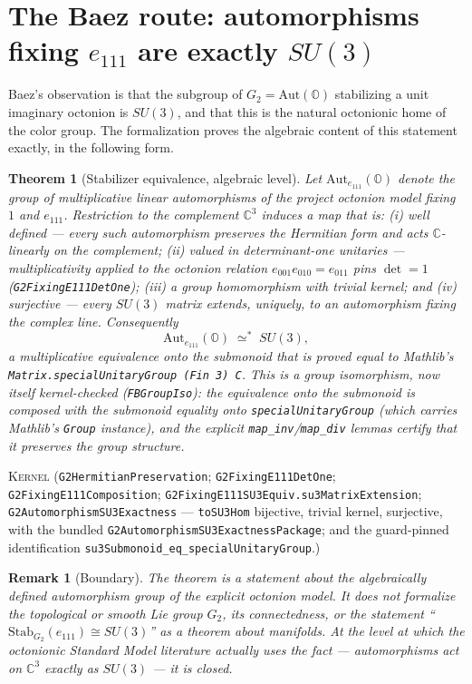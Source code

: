 \documentclass[11pt]{article}
\newcommand{\C}{\mathbb{C}}
\newcommand{\OO}{\mathbb{O}}
\newcommand{\Kernel}{\textcolor{kernelcolor}{\textsc{Kernel}}}
\newcommand{\leanname}[1]{\texttt{#1}}
\newtheorem{theorem}{Theorem}
\newtheorem{remark}{Remark}
\begin{document}
\section{The Baez route: automorphisms fixing $e_{111}$ are exactly $SU(3)$}
\label{sec:baez}

Baez's observation \cite{Baez2021} is that the subgroup of $G_2 =
\mathrm{Aut}(\OO)$ stabilizing a unit imaginary octonion is $SU(3)$, and
that this is the natural octonionic home of the color group.  The
formalization proves the algebraic content of this statement exactly,
in the following form.

\begin{theorem}[Stabilizer equivalence, algebraic level]
\label{thm:su3}
Let $\mathrm{Aut}_{e_{111}}(\OO)$ denote the group of multiplicative
linear automorphisms of the project octonion model fixing $1$ and
$e_{111}$.  Restriction to the complement $\C^3$ induces a map that is:
(i) well defined --- every such automorphism preserves the Hermitian form
and acts $\C$-linearly on the complement; (ii) valued in determinant-one
unitaries --- multiplicativity applied to the octonion relation
$e_{001}e_{010} = e_{011}$ pins
$\det = 1$ (\leanname{G2FixingE111DetOne}); (iii) a group homomorphism with trivial kernel; and (iv)
surjective --- every $SU(3)$ matrix extends, uniquely, to an automorphism
fixing the complex line.  Consequently
\[
\mathrm{Aut}_{e_{111}}(\OO) \;\simeq^*\; SU(3),
\]
a multiplicative equivalence onto the submonoid that is proved
\emph{equal} to Mathlib's
\leanname{Matrix.specialUnitaryGroup (Fin 3) C}.  This is a group
isomorphism, now itself kernel-checked (\leanname{FBGroupIso}): the
equivalence onto the submonoid is composed with the submonoid equality
onto \leanname{specialUnitaryGroup} (which carries Mathlib's
\leanname{Group} instance), and the explicit
\leanname{map\_inv}/\leanname{map\_div} lemmas certify that it preserves
the group structure.
\end{theorem}
\noindent\Kernel{}\quad
(\leanname{G2HermitianPreservation};
\leanname{G2FixingE111DetOne};
\leanname{G2FixingE111Composition};
\leanname{G2FixingE111SU3Equiv.su3MatrixExtension};
\leanname{G2AutomorphismSU3Exactness} ---
\leanname{toSU3Hom} bijective, trivial kernel, surjective, with the
bundled \leanname{G2AutomorphismSU3ExactnessPackage}; and the
guard-pinned identification
\leanname{su3Submonoid\_eq\_specialUnitaryGroup}.)

\begin{remark}[Boundary]
The theorem is a statement about the algebraically defined automorphism
group of the explicit octonion model.  It does not formalize the
topological or smooth Lie group $G_2$, its connectedness, or the
statement ``$\mathrm{Stab}_{G_2}(e_{111}) \cong SU(3)$'' as a theorem
about manifolds.  At the level at which the octonionic Standard Model
literature actually uses the fact --- automorphisms act on
$\C^3$ exactly as $SU(3)$ --- it is closed.
\end{remark}
\end{document}

